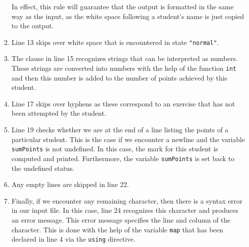 \begin{enumerate}
      In effect, this rule will guarantee that the output is formatted in the same way as
      the input, as the white space following a student's name is just copied to the output.
\item Line 13 skips over white space that is encountered in state \texttt{"normal"}.
\item The clause in line 15 recognizes strings that can be interpreted as numbers.  These
      strings are converted into numbers with the help of the function \texttt{int} and
      then this number is added to the number of points achieved by this student.
\item Line 17 skips over hyphens as these correspond to an exercise that has not been attempted
      by the student.
\item Line 19 checks whether we are at the end of a line listing the points of a particular student.
      This is the case if we encounter a newline and the variable \texttt{sumPoints}
      is not undefined.  In this case, the mark for this student is computed and printed.
      Furthermore, the variable \texttt{sumPoints} is set back to the undefined status.
\item Any empty lines are skipped in line 22.
\item Finally, if we encounter any remaining character, then there is a syntax error
      in our input file.  In this case, line 24 recognizes this character and
      produces an error message.  This error message
      specifies the line and column of the character.  This is done with the help of the
      variable \texttt{map} that has been declared in line 4 via the \texttt{using}
      directive.  
\end{enumerate}

